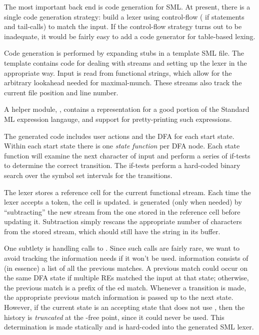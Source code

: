 The most important back end is code generation for SML.  At present, there is a
single code generation strategy: build a lexer using control-flow (\ie
if statements and tail-calls) to match the input.  If the control-flow strategy
turns out to be inadequate, it would be fairly easy to add a code
generator for table-based lexing.

Code generation is performed by expanding stubs in a template SML file.  The
template contains code for dealing with streams and setting up the lexer in the
appropriate way.  Input is read from functional strings, which allow for
the arbitrary lookahead needed for maximal-munch.  These streams also track
the current file position and line number.

A helper module, , contains a representation for a good portion of the
Standard ML expression langauge, and support for pretty-printing such
expressions.

The generated code includes user actions and the DFA for each start state.
 Within each start state there is one \emph{state function} per DFA node.  Each
state function will examine the next character of input and perform a series of
if-tests to determine the correct transition.  The if-tests perform a
hard-coded binary search over the symbol set intervals for the transitions.

The lexer stores a reference cell for the current functional stream.  Each time
the lexer accepts a token, the cell is updated.   is generated (only
when needed) by ``subtracting'' the new stream from the one stored in the
reference cell before updating it.  Subtraction simply rescans the appropriate
number of characters from the stored stream, which should still have the string
in its buffer.

One subtlety is handling calls to .  Since such calls are fairly
rare, we want to avoid tracking the information  needs if it won't
be used.   information consists of (in essence) a list of all the
previous matches.  A previous match could occur on the same DFA state if
multiple REs matched the input at that state; otherwise, the previous match is
a prefix of the ed match.  Whenever a transition is made, the
appropriate previous match information is passed up to the next state. 
However, if the current state is an accepting state that does not use
, then the history is \emph{truncated} at the -free
point, since it could never be used.  This determination is made statically and
is hard-coded into the generated SML lexer.

